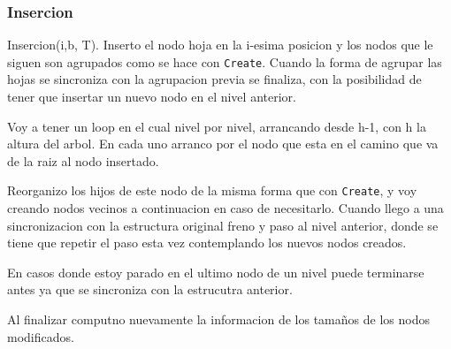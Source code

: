 \documentclass[10pt,handout]{beamer}
\begin{document}
\begin{frame}
  \pause

\end{frame}




\begin{frame}
\frametitle{Insercion}
  Insercion(i,b, T). Inserto el nodo hoja en la i-esima posicion y los nodos que le siguen son agrupados
  como se hace con  \texttt{Create}.
  Cuando la forma de agrupar las hojas se sincroniza con la agrupacion previa se finaliza, con
  la posibilidad de tener que insertar un nuevo nodo en el nivel anterior.

  Voy a tener un loop en el cual nivel por nivel, arrancando desde h-1, con h la altura del arbol.
  En cada uno arranco por el nodo que esta en el camino que va de la raiz al nodo insertado.

  Reorganizo los hijos de este nodo de la misma forma que con \texttt{Create}, y voy creando
  nodos vecinos a continuacion en caso de necesitarlo.
  Cuando llego a una sincronizacion con la estructura original freno y paso al nivel anterior, donde
  se tiene que repetir el paso esta vez contemplando los nuevos nodos creados.

  En casos donde estoy parado en el ultimo nodo de un nivel puede terminarse antes ya que se sincroniza
  con la estrucutra anterior.

   Al finalizar computno nuevamente la informacion de los tamaños de los nodos modificados.
\end{frame}

\end{document}
